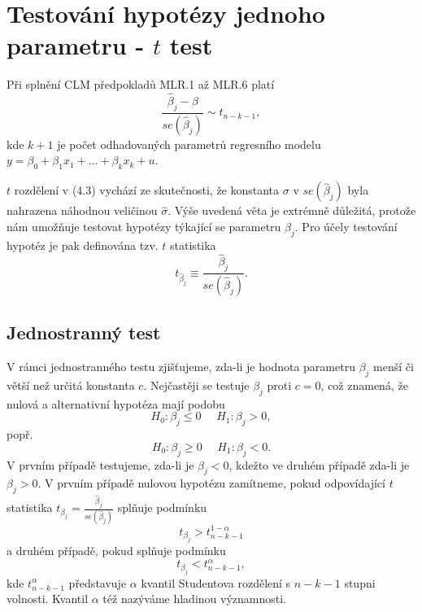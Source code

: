 \section{Testování hypotézy jednoho parametru - $t$ test}
\begin{theorem}
Při splnění CLM předpokladů MLR.1 až MLR.6 platí
\begin{equation}
\frac{\hat{\beta}_j - \beta}{se(\hat{\beta}_j)} \sim t_{n-k-1},
\end{equation}
kde $k + 1$ je počet odhadovaných parametrů regresního modelu $y = \beta_0 + \beta_1 x_1 + ... + \beta_k x_k + u$.

\raggedleft{$\clubsuit$}
\end{theorem}
$t$ rozdělení v (4.3) vychází ze skutečnosti, že konstanta $\sigma$ v $se(\hat{\beta}_j)$ byla nahrazena náhodnou veličinou $\hat{\sigma}$. 
Výše uvedená věta je extrémně důležitá, protože nám umožňuje testovat hypotézy týkající se parametru $\beta_j$. Pro účely 
testování hypotéz je pak definována tzv. $t$ statistika
\begin{equation}
t_{\hat{\beta}_j} \equiv \frac{\hat{\beta}_j}{se(\hat{\beta}_j)}.
\end{equation}

\subsection{Jednostranný test}

V rámci jednostranného testu zjišťujeme, zda-li je hodnota parametru $\beta_j$ menší či větší než určitá konstanta $c$. Nejčastěji se testuje 
$\beta_j$ proti $c = 0$, což znamená, že nulová a alternativní hypotéza mají podobu
\begin{equation}
H_0: \beta_j \le 0 ~~~~~~ H_1: \beta_j > 0,
\end{equation}
popř.
\begin{equation}
H_0: \beta_j \ge 0 ~~~~~~ H_1: \beta_j < 0.
\end{equation}
V prvním případě testujeme, zda-li je $\beta_j < 0$, kdežto ve druhém případě zda-li je $\beta_j > 0$. V prvním případě nulovou 
hypotézu zamítneme, pokud odpovídající $t$ statistika $t_{\beta_j} = \frac{\hat{\beta}_j}{se(\hat{\beta}_j)}$ splňuje podmínku
\begin{equation}
t_{\beta_j} > t_{n-k-1}^{1 - \alpha}
\end{equation}
a druhém případě, pokud splňuje podmínku
\begin{equation}
t_{\beta_j} < t_{n-k-1}^{\alpha},
\end{equation}
kde $t_{n-k-1}^{\alpha}$ představuje $\alpha$ kvantil Studentova rozdělení s $n-k-1$ stupni volnosti. Kvantil $\alpha$ též nazýváme hladinou významnosti.

